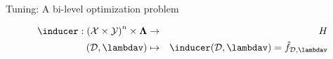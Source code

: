 \documentclass[11pt,compress,t,notes=noshow, xcolor=table]{beamer}
\begin{document}
\begin{vbframe}{Tuning: A bi-level optimization problem}
\begin{itemize}
    \vspace*{-0.2cm}
  \begin{eqnarray*}
    \inducer: \left(\Xspace \times \Yspace\right)^n \times \bm{\Lambda} &\to& \Hspace \\
    (\D, \lambdav) &\mapsto& \inducer(\D, \lambdav) = \hat f_{\D, \lambdav}
  \end{eqnarray*}
  \end{itemize}







  




  
  \end{vbframe}
\end{document}
